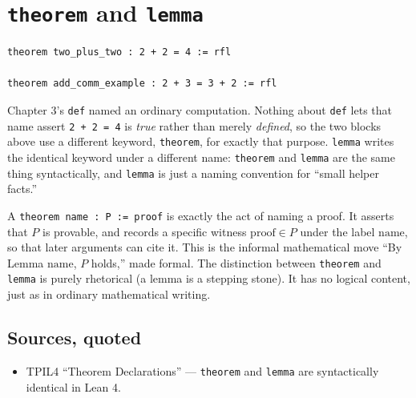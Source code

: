 \section{\texorpdfstring{\texttt{theorem} and \texttt{lemma}}{theorem and lemma}}\label{sec:04-propositions-and-proofs:03-theorem-lemma:1}

\begin{lstlisting}
theorem two_plus_two : 2 + 2 = 4 := rfl

theorem add_comm_example : 2 + 3 = 3 + 2 := rfl
\end{lstlisting}

Chapter 3's \texttt{def} named an ordinary computation. Nothing about \texttt{def} lets that name assert \texttt{2 + 2 = 4} is \emph{true} rather than merely \emph{defined}, so the two blocks above use a different keyword, \texttt{theorem}, for exactly that purpose. \texttt{lemma} writes the identical keyword under a different name: \texttt{theorem} and \texttt{lemma} are the same thing syntactically, and \texttt{lemma} is just a naming convention for ``small helper facts.''

\begin{mathreading}

A \texttt{theorem name : P := proof} is exactly the act of naming a proof. It asserts that \(P\) is provable, and records a specific witness \(\mathrm{proof} \in P\) under the label \(\mathrm{name}\), so that later arguments can cite it. This is the informal mathematical move ``By Lemma \(\mathrm{name}\), \(P\) holds,'' made formal. The distinction between \texttt{theorem} and \texttt{lemma} is purely rhetorical (a lemma is a stepping stone). It has no logical content, just as in ordinary mathematical writing.

\end{mathreading}

\subsection{Sources, quoted}\label{sec:04-propositions-and-proofs:03-theorem-lemma:2}

\begin{itemize}
\tightlist
\item
  TPIL4 ``Theorem Declarations'' --- \texttt{theorem} and \texttt{lemma} are syntactically identical in Lean 4.
\end{itemize}
